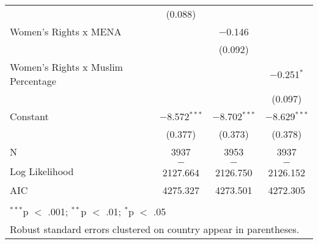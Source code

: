 \begin{table}[!htbp]
\begin{tabular}{@{\extracolsep{5pt}}lccc}
  & (0.088) &  &  \\ 
  Women's Rights x MENA &  & $-$0.146 &  \\ 
  &  & (0.092) &  \\ 
  Women's Rights x Muslim Percentage &  &  & $-$0.251$^{*}$ \\ 
  &  &  & (0.097) \\ 
  Constant & $-$8.572$^{***}$ & $-$8.702$^{***}$ & $-$8.629$^{***}$ \\ 
  & (0.377) & (0.373) & (0.378) \\ 
 N & 3937 & 3953 & 3937 \\ 
Log Likelihood & $-$2127.664 & $-$2126.750 & $-$2126.152 \\ 
AIC & 4275.327 & 4273.501 & 4272.305 \\ 
\hline \\[-1.8ex] 
\multicolumn{4}{l}{$^{***}$p $<$ .001; $^{**}$p $<$ .01; $^{*}$p $<$ .05} \\ 
\multicolumn{4}{l}{Robust standard errors clustered on country appear in parentheses.} \\ 
\end{tabular} 
\end{table} 
